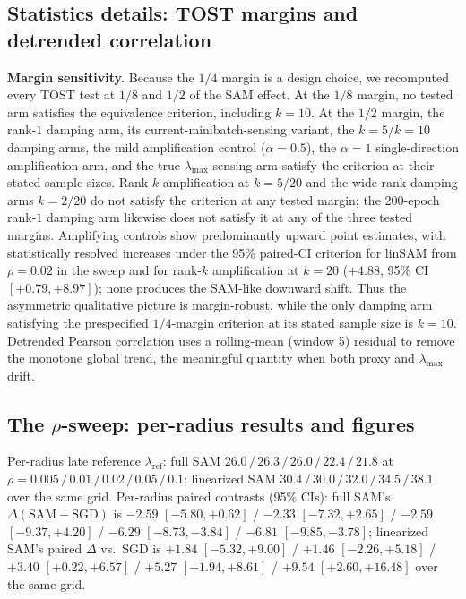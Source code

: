 \documentclass{article}
\theoremstyle{plain}
\theoremstyle{definition}
\theoremstyle{remark}
\newcommand{\lmax}{\lambda_{\max}}
\newcommand{\lref}{\ensuremath{\lambda_{\mathrm{ref}}}}
\begin{document}
\FloatBarrier

\subsection{Statistics details: TOST margins and detrended correlation}\label{sub:tostmargin}
\textbf{Margin sensitivity.} Because the $1/4$ margin is a design choice,
we recomputed every TOST test at $1/8$ and $1/2$ of the SAM effect. At
the $1/8$ margin, no tested arm satisfies the equivalence criterion,
including $k{=}10$. At the $1/2$ margin, the rank-$1$ damping arm, its
current-minibatch-sensing variant, the $k{=}5$/$k{=}10$ damping arms,
the mild amplification control ($\alpha{=}0.5$), the $\alpha{=}1$
single-direction amplification arm, and the true-$\lmax$ sensing arm
satisfy the criterion at their stated sample sizes. Rank-$k$
amplification at $k{=}5/20$ and the wide-rank damping arms $k{=}2/20$
do not satisfy the criterion at any tested margin; the 200-epoch
rank-$1$ damping arm likewise does not satisfy it at any of the three
tested margins. Amplifying controls show predominantly upward point
estimates, with statistically resolved increases under the 95\%
paired-CI criterion for linSAM from $\rho{=}0.02$ in the sweep and
for rank-$k$ amplification at $k{=}20$ ($+4.88$, 95\% CI
$[{+}0.79,{+}8.97]$); none produces the SAM-like downward shift. Thus
the asymmetric qualitative picture is margin-robust, while the only
damping arm satisfying the prespecified $1/4$-margin criterion at its
stated sample size is $k{=}10$.
Detrended Pearson correlation uses a
rolling-mean (window 5) residual to remove the monotone global trend, the
meaningful quantity when both proxy and $\lmax$ drift.

\subsection{The $\rho$-sweep: per-radius results and figures}
\label{sub:rhosweepapp}
Per-radius late reference \lref: full SAM $26.0\,/\,26.3\,/\,26.0\,/\,
22.4\,/\,21.8$ at $\rho{=}0.005\,/\,0.01\,/\,0.02\,/\,0.05\,/\,0.1$;
linearized SAM $30.4\,/\,30.0\,/\,32.0\,/\,34.5\,/\,38.1$ over the same
grid. Per-radius paired contrasts (95\% CIs): full SAM's
$\Delta(\text{SAM}-\text{SGD})$
is $-2.59$ $[-5.80,+0.62]$ / $-2.33$ $[-7.32,+2.65]$ / $-2.59$
$[-9.37,+4.20]$ / $-6.29$ $[-8.73,-3.84]$ / $-6.81$ $[-9.85,-3.78]$;
linearized SAM's paired
$\Delta$ vs.\ SGD is $+1.84$ $[-5.32,+9.00]$ / $+1.46$ $[-2.26,+5.18]$ /
$+3.40$ $[{+}0.22,{+}6.57]$ / $+5.27$ $[{+}1.94,{+}8.61]$ / $+9.54$
$[{+}2.60,{+}16.48]$ over the same grid.
\end{document}
